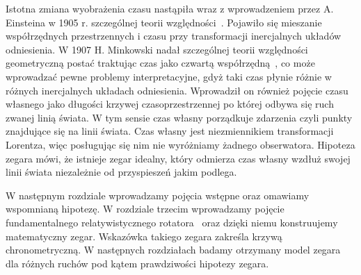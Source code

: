 Istotna zmiana wyobrażenia czasu nastąpiła wraz z wprowadzeniem przez 
A. Einsteina w 1905 r. szczególnej teorii względności~\cite{einstein}.
Pojawiło się mieszanie współrzędnych 
przestrzennych i czasu przy transformacji 
inercjalnych układów odniesienia.
W 1907 H. Minkowski nadał szczególnej teorii względności 
geometryczną postać traktując czas jako czwartą 
współrzędną~\cite{minkowski2013space}, co może 
wprowadzać pewne problemy interpretacyjne, gdyż taki 
czas płynie różnie w różnych inercjalnych 
układach odniesienia.
Wprowadził on również pojęcie czasu własnego jako długości 
krzywej czasoprzestrzennej po której odbywa się ruch zwanej linią świata.
W tym sensie czas własny porządkuje zdarzenia czyli punkty znajdujące
się na linii świata.
Czas własny jest niezmiennikiem transformacji Lorentza, 
więc posługując się
nim nie wyróżniamy żadnego obserwatora.
Hipoteza zegara
mówi, że istnieje zegar idealny, który odmierza czas własny 
wzdłuż swojej linii świata niezależnie od przyspieszeń 
jakim podlega.

W następnym rozdziale wprowadzamy pojęcia wstępne oraz omawiamy 
wspomnianą hipotezę. W rozdziale trzecim wprowadzamy pojęcie 
fundamentalnego relatywistycznego rotatora~\cite{star2008} oraz 
dzięki niemu konstruujemy matematyczny zegar. 
Wskazówka takiego zegara zakreśla krzywą chronometryczną.
W następnych rozdziałach badamy otrzymany model zegara
dla różnych ruchów pod kątem prawdziwości hipotezy zegara.
